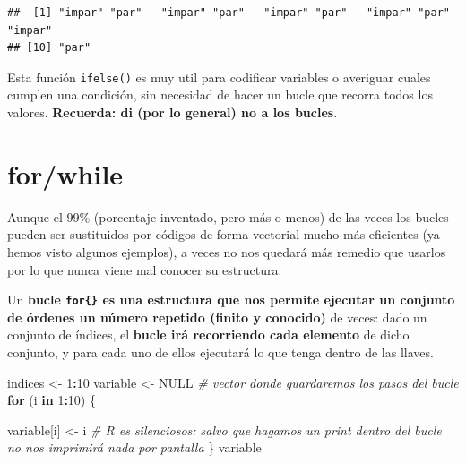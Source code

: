 \documentclass[11pt,]{book}
\newenvironment{Shaded}{\begin{snugshade}}{\end{snugshade}}
\newcommand{\CommentTok}[1]{\textcolor[rgb]{0.37,0.37,0.37}{\textit{#1}}}
\newcommand{\ControlFlowTok}[1]{\textcolor[rgb]{0.27,0.27,0.27}{\textbf{#1}}}
\newcommand{\DecValTok}[1]{\textcolor[rgb]{0.06,0.06,0.06}{#1}}
\newcommand{\KeywordTok}[1]{\textcolor[rgb]{0.27,0.27,0.27}{\textbf{#1}}}
\newcommand{\NormalTok}[1]{#1}
\newcommand{\OperatorTok}[1]{\textcolor[rgb]{0.43,0.43,0.43}{\textbf{#1}}}
\newcommand{\OtherTok}[1]{\textcolor[rgb]{0.37,0.37,0.37}{#1}}
\newcommand{\StringTok}[1]{\textcolor[rgb]{0.5,0.5,0.5}{#1}}
\begin{document}
\begin{Shaded}
\end{Shaded}

\begin{verbatim}
##  [1] "impar" "par"   "impar" "par"   "impar" "par"   "impar" "par"   "impar"
## [10] "par"
\end{verbatim}

Esta función \texttt{ifelse()} es muy util para codificar variables o averiguar cuales cumplen una condición, sin necesidad de hacer un bucle que recorra todos los valores. \textbf{Recuerda: di (por lo general) no a los bucles}.

\hypertarget{forwhile}{%
\section{for/while}\label{forwhile}}

Aunque el 99\% (porcentaje inventado, pero más o menos) de las veces los bucles pueden ser sustituidos por códigos de forma vectorial mucho más eficientes (ya hemos visto algunos ejemplos), a veces no nos quedará más remedio que usarlos por lo que nunca viene mal conocer su estructura.

Un \textbf{bucle \texttt{for\{\}} es una estructura que nos permite ejecutar un conjunto de órdenes un número repetido (finito y conocido)} de veces: dado un conjunto de índices, el \textbf{bucle irá recorriendo cada elemento} de dicho conjunto, y para cada uno de ellos ejecutará lo que tenga dentro de las llaves.

\begin{Shaded}
\begin{Highlighting}[]
\NormalTok{indices <-}\StringTok{ }\DecValTok{1}\OperatorTok{:}\DecValTok{10}
\NormalTok{variable <-}\StringTok{ }\OtherTok{NULL} \CommentTok{# vector donde guardaremos los pasos del bucle}
\ControlFlowTok{for}\NormalTok{ (i }\ControlFlowTok{in} \DecValTok{1}\OperatorTok{:}\DecValTok{10}\NormalTok{) \{ }
  
\NormalTok{  variable[i] <-}\StringTok{ }\NormalTok{i }\CommentTok{# R es silenciosos: salvo que hagamos un print dentro del bucle no nos imprimirá nada por pantalla}
\NormalTok{\}}
\NormalTok{variable}
\end{Highlighting}
\end{Shaded}
\end{document}
